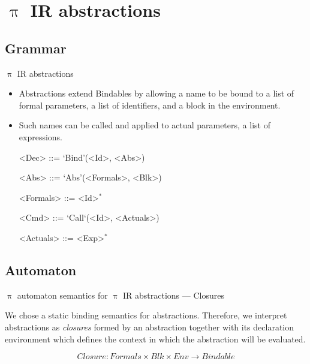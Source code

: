 \documentclass{beamer}
\begin{document}
\section{$\uppi$ IR abstractions}

\subsection{Grammar}


\begin{frame}{{\color{red}$\uppi$ IR} abstractions}

\begin{itemize}
\item Abstractions extend Bindables by allowing a name to be bound to a list of formal parameters, a list of identifiers, and a block in the environment.
\item Such names can be called and applied to actual parameters, a list of expressions.
\begin{grammar}
<Dec>       ::= `Bind'(<Id>, <Abs>) 

<Abs>       ::= `Abs'(<Formals>, <Blk>) 

<Formals> ::= <Id>$^*$

<Cmd> ::= `Call`(<Id>, <Actuals>)

<Actuals> ::= <Exp>$^*$
\end{grammar}
\end{itemize}

\end{frame}

\subsection{Automaton}

\begin{frame}{{\color{red}$\uppi$ automaton} semantics for {\color{red}$\uppi$ IR} abstractions --- Closures}

We chose a static binding semantics for abstractions. Therefore, we interpret abstractions as \emph{closures} formed by an abstraction together with its declaration environment which defines the context in which the abstraction will be evaluated.

\[
\mathit{Closure} : \mathit{Formals} \times \mathit{Blk} \times \mathit{Env} \to \mathit{Bindable}
\]

\end{frame}
\end{document}
